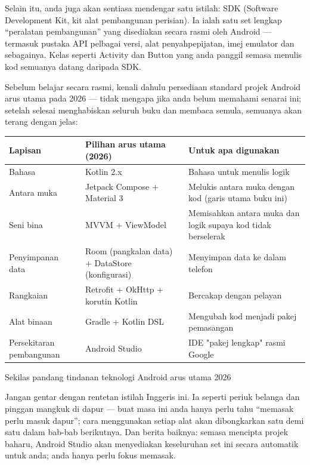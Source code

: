 Selain itu, anda juga akan sentiasa mendengar satu istilah: SDK (Software Development Kit, kit alat pembangunan perisian). Ia ialah satu set lengkap “peralatan pembangunan” yang disediakan secara rasmi oleh Android — termasuk pustaka API pelbagai versi, alat penyahpepijatan, imej emulator dan sebagainya. Kelas seperti Activity dan Button yang anda panggil semasa menulis kod semuanya datang daripada SDK.


Sebelum belajar secara rasmi, kenali dahulu persediaan standard projek Android arus utama pada 2026 — tidak mengapa jika anda belum memahami senarai ini; setelah selesai menghabiskan seluruh buku dan membaca semula, semuanya akan terang dengan jelas:

\begin{center}
\begin{tabularx}{\linewidth}{|X|X|X|}
\hline
\textbf{Lapisan} & \textbf{Pilihan arus utama (2026)} & \textbf{Untuk apa digunakan} \tabularnewline
\hline
Bahasa & Kotlin 2.x & Bahasa untuk menulis logik \tabularnewline
Antara muka & Jetpack Compose + Material 3 & Melukis antara muka dengan kod (garis utama buku ini) \tabularnewline
Seni bina & MVVM + ViewModel & Memisahkan antara muka dan logik supaya kod tidak berselerak \tabularnewline
Penyimpanan data & Room (pangkalan data) + DataStore (konfigurasi) & Menyimpan data ke dalam telefon \tabularnewline
Rangkaian & Retrofit + OkHttp + korutin Kotlin & Bercakap dengan pelayan \tabularnewline
Alat binaan & Gradle + Kotlin DSL & Mengubah kod menjadi pakej pemasangan \tabularnewline
Persekitaran pembangunan & Android Studio & IDE "pakej lengkap" rasmi Google \tabularnewline
\hline
\end{tabularx}
\end{center}

\begin{center}\small\color{gray}Sekilas pandang tindanan teknologi Android arus utama 2026\end{center}

Jangan gentar dengan rentetan istilah Inggeris ini. Ia seperti periuk belanga dan pinggan mangkuk di dapur — buat masa ini anda hanya perlu tahu “memasak perlu masuk dapur”; cara menggunakan setiap alat akan dibongkarkan satu demi satu dalam bab-bab berikutnya. Dan berita baiknya: semasa mencipta projek baharu, Android Studio akan menyediakan keseluruhan set ini secara automatik untuk anda; anda hanya perlu fokus memasak.

